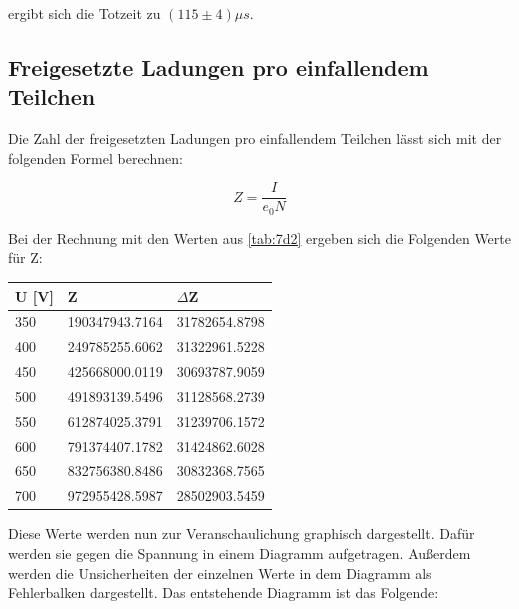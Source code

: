 \noindent ergibt  sich die Totzeit zu $(115 \pm 4)\mu s$.

\subsection{Freigesetzte Ladungen pro einfallendem Teilchen}

Die Zahl der freigesetzten Ladungen pro einfallendem Teilchen lässt sich mit der folgenden Formel berechnen:

\begin{displaymath}
    Z = \frac{I}{e_0N}
\end{displaymath}

Bei der Rechnung mit den Werten aus \ref{tab:7d2} ergeben sich die Folgenden Werte für Z:

\begin{minipage}{\linewidth}
    \begin{table}[H]
        \centering
    
    \begin{tabular}{ll@{${}\pm{}$}l}
        \toprule
        U [V] & Z & $\Delta$Z\\
        \midrule
        350 & 190347943.7164 & 31782654.8798 \\
        400 & 249785255.6062 & 31322961.5228 \\
        450 & 425668000.0119 & 30693787.9059 \\
        500 & 491893139.5496 & 31128568.2739 \\
        550 & 612874025.3791 & 31239706.1572 \\
        600 & 791374407.1782 & 31424862.6028 \\
        650 & 832756380.8486 & 30832368.7565 \\
        700 & 972955428.5987 & 28502903.5459 \\
        \bottomrule
        
    \end{tabular}
    \label{tab:7d}
    \end{table}
\end{minipage}

\noindent Diese Werte werden nun zur Veranschaulichung graphisch dargestellt.
Dafür werden sie gegen die Spannung in einem Diagramm aufgetragen.
Außerdem werden die Unsicherheiten der einzelnen Werte in dem Diagramm als Fehlerbalken dargestellt.
Das entstehende Diagramm ist das Folgende:

